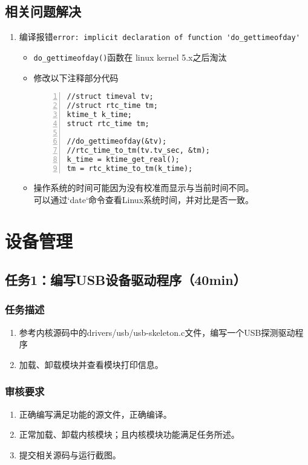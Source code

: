\documentclass{article}
\begin{document}
\subsection{相关问题解决}
\begin{enumerate}
    \item 编译报错\verb|error: implicit declaration of function 'do_gettimeofday'|
    \begin{itemize}
        \item \verb|do_gettimeofday()|函数在 linux kernel 5.x之后淘汰
        \item 修改以下注释部分代码
\begin{lstlisting}[numbers=left]
//struct timeval tv;
//struct rtc_time tm;
ktime_t k_time;
struct rtc_time tm;

//do_gettimeofday(&tv);
//rtc_time_to_tm(tv.tv_sec, &tm);
k_time = ktime_get_real();
tm = rtc_ktime_to_tm(k_time); 
\end{lstlisting}
        \item 操作系统的时间可能因为没有校准而显示与当前时间不同。\\
        可以通过`date`命令查看Linux系统时间，并对比是否一致。
    \end{itemize}
\end{enumerate}
\newpage
\section{设备管理}
\subsection{任务1：编写USB设备驱动程序（40min）}

\subsubsection{任务描述}
\begin{enumerate}
    \item 参考内核源码中的drivers/usb/usb-skeleton.c文件，编写一个USB探测驱动程序
    \item 加载、卸载模块并查看模块打印信息。
\end{enumerate}

\subsubsection{审核要求}
\begin{enumerate}
    \item 正确编写满足功能的源文件，正确编译。
    \item 正常加载、卸载内核模块；且内核模块功能满足任务所述。
    \item 提交相关源码与运行截图。
\end{enumerate}
\end{document}
